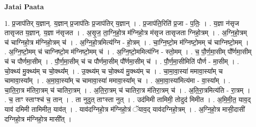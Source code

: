 \documentclass[17pt]{extarticle}
\begin{document}
\textbf{Jatai Paata} \newline

1. प्र॒जाप॑तिर् य॒ज्ञान्. य॒ज्ञान् प्र॒जाप॑तिः प्र॒जाप॑तिर् य॒ज्ञान् । . प्र॒जाप॑ति॒रिति॑ प्र॒जा - प॒तिः॒ । . य॒ज्ञा न॑सृज तासृजत य॒ज्ञान्. य॒ज्ञा न॑सृजत । . अ॒सृ॒ज॒ ता॒ग्नि॒हो॒त्र म॑ग्निहो॒त्र म॑सृज तासृजता ग्निहो॒त्रम् । . अ॒ग्नि॒हो॒त्रम् च॑ चाग्निहो॒त्र म॑ग्निहो॒त्रम् च॑ । . अ॒ग्नि॒हो॒त्रमित्य॑ग्नि - हो॒त्रम् । . चा॒ग्नि॒ष्टो॒म म॑ग्निष्टो॒मम् च॑ चाग्निष्टो॒मम् । . अ॒ग्नि॒ष्टो॒मम् च॑ चाग्निष्टो॒म म॑ग्निष्टो॒मम् च॑ । . अ॒ग्नि॒ष्टो॒ममित्य॑ग्नि - स्तो॒मम् । . च॒ पौ॒र्ण॒मा॒सीम् पौ᳚र्णमा॒सीम् च॑ च पौर्णमा॒सीम् । . पौ॒र्ण॒मा॒सीम् च॑ च पौर्णमा॒सीम् पौ᳚र्णमा॒सीम् च॑ । . पौ॒र्ण॒मा॒सीमिति॑ पौर्ण - मा॒सीम् । . चो॒क्थ्य॑ मु॒क्थ्य॑म् च चो॒क्थ्य᳚म् । . उ॒क्थ्य॑म् च चो॒क्थ्य॑ मु॒क्थ्य॑म् च । . चा॒मा॒वा॒स्या॑ ममावा॒स्या᳚म् च चामावा॒स्या᳚म् । . अ॒मा॒वा॒स्या᳚म् च चामावा॒स्या॑ ममावा॒स्या᳚म् च । . अ॒मा॒वा॒स्या॑मित्य॑मा - वा॒स्या᳚म् । . चा॒ति॒रा॒त्र म॑तिरा॒त्रम् च॑ चातिरा॒त्रम् । . अ॒ति॒रा॒त्रम् च॑ चातिरा॒त्र म॑तिरा॒त्रम् च॑ । . अ॒ति॒रा॒त्रमित्य॑ति - रा॒त्रम् । . च॒ ताꣳ स्ताꣳश्च॑ च॒ तान् । . ता नुदुत् ताꣳस्ता नुत् । . उद॑मिमी तामिमी॒ तोदुद॑ मिमीत । . अ॒मि॒मी॒त॒ याव॒द् याव॑ दमिमी तामिमीत॒ याव॑त् । . याव॑दग्निहो॒त्र म॑ग्निहो॒त्रं ॅयाव॒द् याव॑दग्निहो॒त्रम् । . अ॒ग्नि॒हो॒त्र मासी॒दासी॑ दग्निहो॒त्र म॑ग्निहो॒त्र मासी᳚त् । \newline
\end{document}

